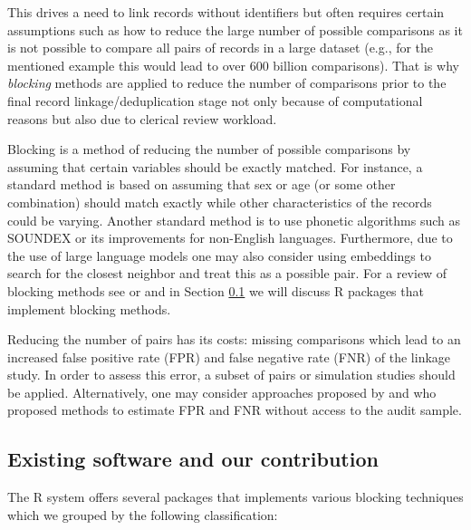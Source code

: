 This drives a need to link records without identifiers but often requires certain assumptions such as how to reduce the large number of possible comparisons as it is not possible to compare all pairs of records in a large dataset (e.g., for the mentioned example this would lead to over 600 billion comparisons). That is why \emph{blocking} methods are applied to reduce the number of comparisons prior to the final record linkage/deduplication stage not only because of computational reasons but also due to clerical review workload.

Blocking is a method of reducing the number of possible comparisons by assuming that certain variables should be exactly matched. For instance, a standard method is based on assuming that sex or age (or some other combination) should match exactly while other characteristics of the records could be varying. Another standard method is to use phonetic algorithms such as SOUNDEX or its improvements for non-English languages. Furthermore, due to the use of large language models one may also consider using embeddings to search for the closest neighbor and treat this as a possible pair. For a review of blocking methods see \citet{Steorts2014} or \citet{Papadakis2020} and in Section \ref{sec-software} we will discuss R packages that implement blocking methods.

Reducing the number of pairs has its costs: missing comparisons which lead to an increased false positive rate (FPR) and false negative rate (FNR) of the linkage study. In order to assess this error, a subset of pairs or simulation studies should be applied. Alternatively, one may consider approaches proposed by \citet{dasylva2021estimating} and \citet{dasylva2022consistent} who proposed methods to estimate FPR and FNR without access to the audit sample.

\subsection{Existing software and our contribution}\label{sec-software}

The R system offers several packages that implements various blocking techniques which we grouped by the following classification:

